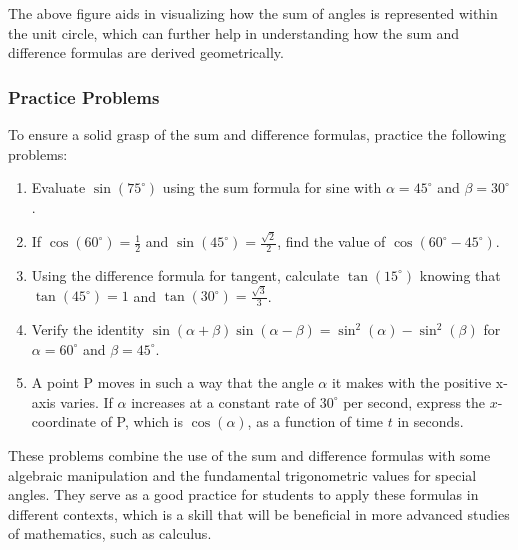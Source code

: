 \documentclass[a4paper,12pt]{book}
\newcounter{problem}
\begin{document}
The above figure aids in visualizing how the sum of angles is represented within the unit circle, which can further help in understanding how the sum and difference formulas are derived geometrically.

\subsubsection{Practice Problems}
\label{subsubsec:practice_problems_sum_difference}

To ensure a solid grasp of the sum and difference formulas, practice the following problems:

\begin{enumerate}
    \item Evaluate $\sin(75^\circ)$ using the sum formula for sine with $\alpha = 45^\circ$ and $\beta = 30^\circ$.
    \item If $\cos(60^\circ) = \frac{1}{2}$ and $\sin(45^\circ) = \frac{\sqrt{2}}{2}$, find the value of $\cos(60^\circ - 45^\circ)$.
    \item Using the difference formula for tangent, calculate $\tan(15^\circ)$ knowing that $\tan(45^\circ) = 1$ and $\tan(30^\circ) = \frac{\sqrt{3}}{3}$.
    \item Verify the identity $\sin(\alpha + \beta)\sin(\alpha - \beta) = \sin^2(\alpha) - \sin^2(\beta)$ for $\alpha = 60^\circ$ and $\beta = 45^\circ$.
    \item A point P moves in such a way that the angle $\alpha$ it makes with the positive x-axis varies. If $\alpha$ increases at a constant rate of $30^\circ$ per second, express the $x$-coordinate of P, which is $\cos(\alpha)$, as a function of time $t$ in seconds.
\end{enumerate}

These problems combine the use of the sum and difference formulas with some algebraic manipulation and the fundamental trigonometric values for special angles. They serve as a good practice for students to apply these formulas in different contexts, which is a skill that will be beneficial in more advanced studies of mathematics, such as calculus.

\end{document}
